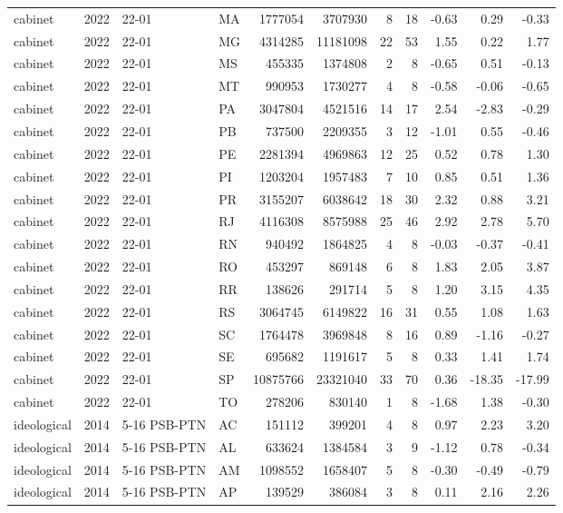 \begin{landscape}
\begin{longtable}{lllL{1.4cm}rrrrrrr}
cabinet & 2022 & 22-01 & MA & 1777054 & 3707930 & 8 & 18 & -0.63 & 0.29 & -0.33 \\
cabinet & 2022 & 22-01 & MG & 4314285 & 11181098 & 22 & 53 & 1.55 & 0.22 & 1.77 \\
cabinet & 2022 & 22-01 & MS & 455335 & 1374808 & 2 & 8 & -0.65 & 0.51 & -0.13 \\
cabinet & 2022 & 22-01 & MT & 990953 & 1730277 & 4 & 8 & -0.58 & -0.06 & -0.65 \\
cabinet & 2022 & 22-01 & PA & 3047804 & 4521516 & 14 & 17 & 2.54 & -2.83 & -0.29 \\
cabinet & 2022 & 22-01 & PB & 737500 & 2209355 & 3 & 12 & -1.01 & 0.55 & -0.46 \\
cabinet & 2022 & 22-01 & PE & 2281394 & 4969863 & 12 & 25 & 0.52 & 0.78 & 1.30 \\
cabinet & 2022 & 22-01 & PI & 1203204 & 1957483 & 7 & 10 & 0.85 & 0.51 & 1.36 \\
cabinet & 2022 & 22-01 & PR & 3155207 & 6038642 & 18 & 30 & 2.32 & 0.88 & 3.21 \\
cabinet & 2022 & 22-01 & RJ & 4116308 & 8575988 & 25 & 46 & 2.92 & 2.78 & 5.70 \\
cabinet & 2022 & 22-01 & RN & 940492 & 1864825 & 4 & 8 & -0.03 & -0.37 & -0.41 \\
cabinet & 2022 & 22-01 & RO & 453297 & 869148 & 6 & 8 & 1.83 & 2.05 & 3.87 \\
cabinet & 2022 & 22-01 & RR & 138626 & 291714 & 5 & 8 & 1.20 & 3.15 & 4.35 \\
cabinet & 2022 & 22-01 & RS & 3064745 & 6149822 & 16 & 31 & 0.55 & 1.08 & 1.63 \\
cabinet & 2022 & 22-01 & SC & 1764478 & 3969848 & 8 & 16 & 0.89 & -1.16 & -0.27 \\
cabinet & 2022 & 22-01 & SE & 695682 & 1191617 & 5 & 8 & 0.33 & 1.41 & 1.74 \\
cabinet & 2022 & 22-01 & SP & 10875766 & 23321040 & 33 & 70 & 0.36 & -18.35 & -17.99 \\
cabinet & 2022 & 22-01 & TO & 278206 & 830140 & 1 & 8 & -1.68 & 1.38 & -0.30 \\
ideological & 2014 & 5-16 PSB-PTN & AC & 151112 & 399201 & 4 & 8 & 0.97 & 2.23 & 3.20 \\
ideological & 2014 & 5-16 PSB-PTN & AL & 633624 & 1384584 & 3 & 9 & -1.12 & 0.78 & -0.34 \\
ideological & 2014 & 5-16 PSB-PTN & AM & 1098552 & 1658407 & 5 & 8 & -0.30 & -0.49 & -0.79 \\
ideological & 2014 & 5-16 PSB-PTN & AP & 139529 & 386084 & 3 & 8 & 0.11 & 2.16 & 2.26 \\

\end{longtable}
\end{landscape}
